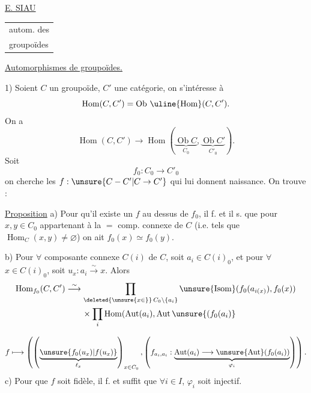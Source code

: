 
\uline{E. SIAU}

\begin{tabular}{l}
autom. des\\
groupoïdes
\end{tabular}

\uline{Automorphismes de groupoïdes.}

1) Soient $C$  un groupoïde,
$C'$ une catégorie, on s'intéresse à
\[
\operatorname{Hom}(C,C')=\operatorname{Ob}\,\uline{\operatorname{Hom}}(C,C').
\]
On a
\[
\operatorname{Hom}(C,C')\longrightarrow
\operatorname{Hom}(\underbrace{\operatorname{Ob}C}_{C_0},\underbrace{\operatorname{Ob}C'}_{C'_0}).
\]
Soit
\[ f_0:C_0\longrightarrow C'_0 \]
on cherche les $f:\unsure{C-C'|C\to C'}$ qui lui donnent naissance. On trouve :

\uline{Proposition} a) Pour qu'il existe un $f$ au dessus de $f_0$, il f. et il s.
que pour $x,y\in C_0$ appartenant à la $=$ comp. connexe de $C$
(i.e. tels que $\operatorname{Hom}_C(x,y)\ne\varnothing$) on ait
$f_0(x)\simeq f_0(y)$.

b) Pour $\forall$ composante connexe $C(i)$ de $C$, soit $a_i\in C(i)_0$,
et pour $\forall$ $x\in C(i)_0$, soit
$u_x:a_i\overset{\sim}{\longrightarrow}x$. Alors
\[
\begin{aligned}
\operatorname{Hom}_{f_0}(C,C')&\overset{\sim}{\longrightarrow}
\prod_{\deleted{\unsure{x\in}}\,C_0\setminus\{a_i\}}
\unsure{\operatorname{Isom}}(f_0(a_{i(x)}),f_0(x))\\
&\qquad\times\prod_i\operatorname{Hom}(\operatorname{Aut}(a_i),\operatorname{Aut}\unsure{(f_0(a_i)}
\end{aligned}
\]

\[
f\longmapsto\left(
\left(\underbrace{\unsure{f_0(u_x)|f(u_x)}}_{\ell_x}\right)_{x\in C_0},
\left(f_{a_i,a_i}:\underbrace{\operatorname{Aut}(a_i)\longrightarrow
\unsure{\operatorname{Aut}}(f_0(a_i))}_{\varphi_i}\right)\right).
\]
c) Pour que $f$ soit fidèle, il f. et suffit que $\forall i\in I$, $\varphi_i$ soit injectif.

